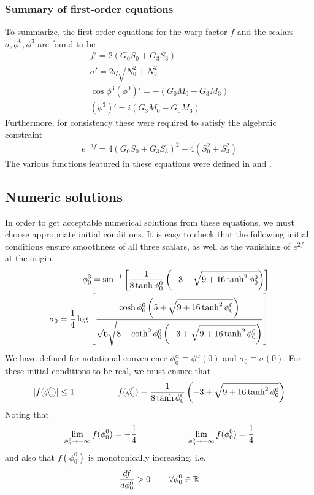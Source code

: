 \documentclass[12pt]{article}
\begin{document}
\subsubsection{Summary of first-order equations}
To summarize, the first-order equations for the warp factor $f$ and the scalars $\sigma,\phi^0,\phi^3$ are found to be
\begin{eqnarray}
f'=2\left(G_0S_0+ G_3S_3\right)
\nonumber \\%
 \sigma'=2 \eta \sqrt{N_0^2 + N_3^2}
\nonumber \\%
\cos \phi^3 \left(\phi^0\right)'=-\left(G_0M_0+G_3M_3\right)
\nonumber\\%
 \left(\phi^3\right)'=i \left(G_3 M_0-G_0M_3\right)
\end{eqnarray}
Furthermore, for consistency these were required to satisfy the algebraic constraint
\begin{eqnarray}
e^{-2f}=4\left(G_0S_0+G_3S_3\right)^2-4 \left(S_0^2+S_3^2\right)
\end{eqnarray}
The various functions featured in these equations were defined in and .
\subsection{Numeric solutions}
In order to get acceptable numerical solutions from these equations, we must choose appropriate initial conditions. It is easy to check that the following initial conditions ensure smoothness of all three scalars, as well as the vanishing of $e^{2f}$ at the origin,
\begin{eqnarray}
 \phi^3_0 = \sin^{-1} \left[{1 \over 8 \tanh\phi^0_0}\left(-3 + \sqrt{9 + 16 \tanh^2 \phi^0_0}\right) \right]
\nonumber\\
\sigma_0 = {1 \over 4} \log \left[{\cosh \phi^0_0 \left(5 + \sqrt{9 + 16 \tanh^2 \phi^0_0} \right) \over \sqrt{6}\sqrt{8 + \coth^2 \phi^0_0 \left(-3 + \sqrt{9 + 16 \tanh^2 \phi^0_0} \right)}}\right]
\end{eqnarray}
We have defined for notational convenience $\phi^\alpha_0 \equiv \phi^\alpha(0)$ and $\sigma_0 \equiv \sigma(0)$. For these initial conditions to be real, we must ensure that
\begin{eqnarray}
|f(\phi^0_0)| \leq 1 \hspace{0.7 in} f(\phi^0_0) \equiv {1 \over 8 \tanh\phi^0_0}\left(-3 + \sqrt{9 + 16 \tanh^2 \phi^0_0}\right) 
\end{eqnarray}
Noting that 
\begin{eqnarray}
\lim_{\phi^0_0 \rightarrow - \infty} f(\phi^0_0) = - {1 \over 4} \hspace{0.8 in} \lim_{\phi^0_0 \rightarrow + \infty} f(\phi^0_0) ={1 \over 4}
\end{eqnarray}
and also that $f(\phi^0_0)$ is monotonically increasing, i.e.
\begin{eqnarray}
{d f \over d \phi^0_0} >0\hspace{0.3in} \forall \phi^0_0 \in \mathbb R
\end{eqnarray}
\end{document}
